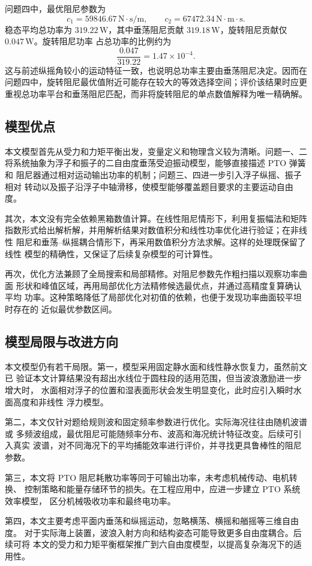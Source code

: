 问题四中，最优阻尼参数为
\[
  c_1=59846.67\,\mathrm{N\cdot s/m},\qquad
  c_2=67472.34\,\mathrm{N\cdot m\cdot s}.
\]
稳态平均总功率为 $319.22\,\mathrm{W}$，其中垂荡阻尼贡献
$319.18\,\mathrm{W}$，旋转阻尼贡献仅 $0.047\,\mathrm{W}$。旋转阻尼功率
占总功率的比例约为
\[
  \frac{0.047}{319.22}=1.47\times10^{-4}.
\]
这与前述纵摇角较小的运动特征一致，也说明总功率主要由垂荡阻尼决定。因而在
问题四中，旋转阻尼最优值附近可能存在较大的等效选择空间；评价该结果时应更
重视总功率平台和垂荡阻尼匹配，而非将旋转阻尼的单点数值解释为唯一精确解。

\subsection{模型优点}

本文模型首先从受力和力矩平衡出发，变量定义和物理含义较为清晰。问题一、二
将系统抽象为浮子和振子的二自由度垂荡受迫振动模型，能够直接描述 PTO 弹簧和
阻尼器通过相对运动输出功率的机制；问题三、四进一步引入浮子纵摇、振子相对
转动以及振子沿浮子中轴滑移，使模型能够覆盖题目要求的主要运动自由度。

其次，本文没有完全依赖黑箱数值计算。在线性阻尼情形下，利用复振幅法和矩阵
指数形式给出解析解，并用解析结果对数值积分和线性功率优化进行验证；在非线性
阻尼和垂荡--纵摇耦合情形下，再采用数值积分方法求解。这样的处理既保留了线性
模型的精确性，又保证了后续复杂模型的可计算性。

再次，优化方法兼顾了全局搜索和局部精修。对阻尼参数先作粗扫描以观察功率曲面
形状和峰值区域，再用局部优化方法精修候选最优点，并通过高精度复算确认平均
功率。这种策略降低了局部优化对初值的依赖，也便于发现功率曲面较平坦时存在的
近似最优参数区间。

\subsection{模型局限与改进方向}

本文模型仍有若干局限。第一，模型采用固定静水面和线性静水恢复力，虽然前文已
验证本文计算结果没有超出水线位于圆柱段的适用范围，但当波浪激励进一步增大时，
水面相对浮子的位置和湿表面形状会发生明显变化，此时应引入瞬时水面高度和非线性
浮力模型。

第二，本文仅针对题给规则波和固定频率参数进行优化。实际海况往往由随机波谱或
多频波组成，最优阻尼可能随频率分布、波高和海况统计特征改变。后续可引入真实
波谱，对不同海况下的平均捕能效率进行评价，并寻找更具鲁棒性的阻尼参数。

第三，本文将 PTO 阻尼耗散功率等同于可输出功率，未考虑机械传动、电机转换、
控制策略和能量存储环节的损失。在工程应用中，应进一步建立 PTO 系统效率模型，
区分机械吸收功率和最终电功率。

第四，本文主要考虑平面内垂荡和纵摇运动，忽略横荡、横摇和艏摇等三维自由度。
对于实际海上装置，波浪入射方向和结构姿态可能导致更多自由度耦合。后续可将
本文的受力和力矩平衡框架推广到六自由度模型，以提高复杂海况下的适用性。

